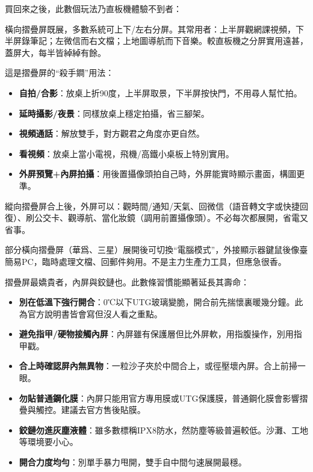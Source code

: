 
買回來之後，此數個玩法乃直板機體驗不到者：


橫向摺疊屏既展，多數系統可上下/左右分屏。其常用者：上半屏觀網課視頻，下半屏錄筆記；左微信而右文檔；上地圖導航而下音樂。較直板機之分屏實用遠甚，蓋屏大，每半皆綽綽有餘。


這是摺疊屏的“殺手鐧”用法：

\begin{itemize}
  \item \textbf{自拍/合影}：放桌上折90度，上半屏取景，下半屏按快門，不用尋人幫忙拍。
  \item \textbf{延時攝影/夜景}：同樣放桌上穩定拍攝，省三腳架。
  \item \textbf{視頻通話}：解放雙手，對方觀君之角度亦更自然。
  \item \textbf{看視頻}：放桌上當小電視，飛機/高鐵小桌板上特別實用。
  \item \textbf{外屏預覽+內屏拍攝}：用後置攝像頭拍自己時，外屏能實時顯示畫面，構圖更準。
\end{itemize}


縱向摺疊屏合上後，外屏可以：觀時間/通知/天氣、回微信（語音轉文字或快捷回復）、刷公交卡、觀導航、當化妝鏡（調用前置攝像頭）。不必每次都展開，省電又省事。


部分橫向摺疊屏（華爲、三星）展開後可切換“電腦模式”，外接顯示器鍵鼠後像臺簡易PC，臨時處理文檔、回郵件夠用。不是主力生產力工具，但應急很香。


摺疊屏最嬌貴者，內屏與鉸鏈也。此數條習慣能顯著延長其壽命：

\begin{itemize}
  \item \textbf{別在低溫下強行開合}：0℃以下UTG玻璃變脆，開合前先揣懷裏暖幾分鐘。此為官方說明書皆會寫但沒人看之重點。
  \item \textbf{避免指甲/硬物接觸內屏}：內屏雖有保護層但比外屏軟，用指腹操作，別用指甲戳。
  \item \textbf{合上時確認屏內無異物}：一粒沙子夾於中間合上，或徑壓壞內屏。合上前掃一眼。
  \item \textbf{勿貼普通鋼化膜}：內屏只能用官方專用膜或UTG保護膜，普通鋼化膜會影響摺疊與觸控。建議去官方售後貼膜。
  \item \textbf{鉸鏈勿進灰塵液體}：雖多數標稱IPX8防水，然防塵等級普遍較低。沙灘、工地等環境要小心。
  \item \textbf{開合力度均勻}：別單手暴力甩開，雙手自中間勻速展開最穩。
\end{itemize}

